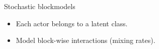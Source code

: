 \documentclass{beamer}
\begin{document}
\begin{frame}{Stochastic blockmodels}

\begin{itemize}
\item Each actor belongs to a latent class. 
\item Model block-wise interactions (mixing rates).
\end{itemize}


\end{frame}
\end{document}
